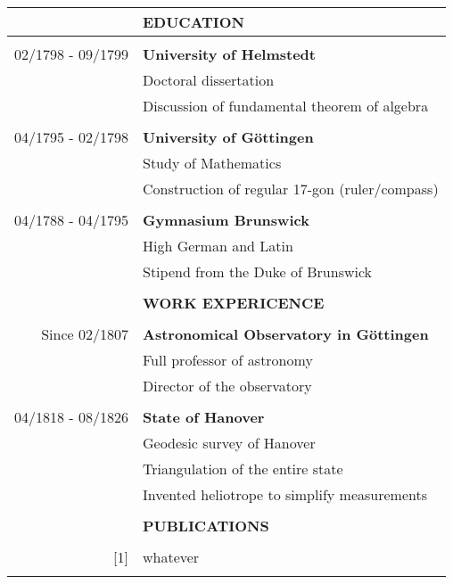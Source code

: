 \documentclass[11pt]{article}
\newcommand{\largespace}{\\[2pt]}
\newcommand{\mediumspace}{\\[-3pt]}
\newcommand{\smallspace}{\\[-5pt]}
\newcommand{\titlefont}[1]{\uppercase{\textbf{\Large{#1}}}}
\begin{document}
\begin{tcbposter}[
    poster = {columns=1, rows=1, spacing=0pt},
    boxes = {sharp corners, halign=center, valign=center, boxrule=0pt}
]
{    \color{minimal-black}

    \begin{tabular}{>{\footnotesize}rl}

        & \titlefont{Education} \\ \hline \mediumspace

        02/1798 - 09/1799
            & \textbf{University of Helmstedt} \\
            & Doctoral dissertation \\
            & Discussion of fundamental theorem of algebra \\
            & \smallspace

        04/1795 - 02/1798
            & \textbf{University of Göttingen} \\
            & Study of Mathematics \\
            & Construction of regular 17-gon (ruler/compass) \\
            & \smallspace

        04/1788 - 04/1795
            & \textbf{Gymnasium Brunswick}\\
            & High German and Latin \\
            & Stipend from the Duke of Brunswick \\
            & \smallspace

        & \titlefont{Work Expericence} \\ \hline \mediumspace

        Since 02/1807
            & \textbf{Astronomical Observatory in Göttingen} \\
            & Full professor of astronomy \\
            & Director of the observatory \\
            & \largespace

        04/1818 - 08/1826
            & \textbf{State of Hanover} \\
            & Geodesic survey of Hanover \\
            & Triangulation of the entire state \\
            & Invented heliotrope to simplify measurements \\ 
            & \largespace

        & \titlefont{Publications} \\ \hline \mediumspace

        [1]
            & whatever \\
            & \largespace


\end{tabular}}
\end{tcbposter}
\end{document}
